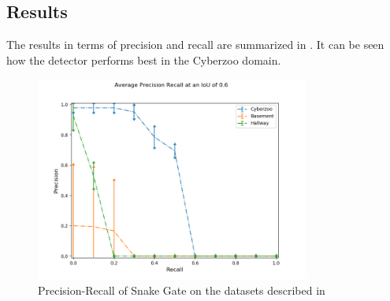 \subsection{Results}

The results in terms of precision and recall are summarized in . It can be seen how the detector performs best in the Cyberzoo domain.

\begin{figure}
	\includegraphics[width=0.8\textwidth]{fig/snake_results_real}
	\caption{Precision-Recall of Snake Gate on the datasets described in }
	\label{fig:snake_results_real}
\end{figure}

\fi